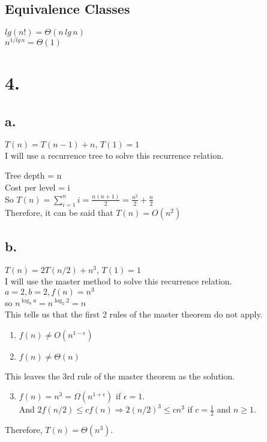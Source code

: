 \documentclass[12pt]{article}
\begin{document}
\subsection*{Equivalence Classes}
$lg(n!) = \Theta(n\,lg\,n)$\\
$n^{1/lg\,n} = \Theta(1)$

\section*{4.}
\subsection*{a.} $T(n) = T(n-1)+n,\,T(1) = 1$\\
I will use a recurrence tree to solve this recurrence relation.\\
\begin{center}
\end{center}
Tree depth = n\\
Cost per level = i\\
So $T(n) = \sum_{i = 1}^{n} i = \frac{n(n+1)}{2} = \frac{n^2}{2} + \frac{n}{2}$\\
Therefore, it can be said that $T(n) =  O(n^2)$\\
\subsection*{b.} $T(n) = 2T(n/2)+n^3,\,T(1) = 1$\\
I will use the master method to solve this recurrence relation.\\
$a=2, b=2, f(n)=n^3$\\
so $n^{\log_{b} a} = n^{\log_{2} 2} = n$\\
This tells us that the first 2 rules of the master theorem do not apply.
\begin{enumerate}
\item $f(n) \ne O(n^{1-\epsilon})$
\item $f(n) \ne \Theta{(n)}$
\end{enumerate}
This leaves the 3rd rule of the master theorem as the solution.\\
\begin{enumerate}
\setcounter{enumi}{2}
\item $f(n) = n^3 = \Omega{(n^{1+\epsilon})}$ if $\epsilon = 1$. \\ 
And $2f(n/2) \le cf(n) \Rightarrow 2(n/2)^3 \le cn^3$ if $c=\frac{1}{2}$ and $n \ge 1$.\\
\end{enumerate}
Therefore, $T(n) = \Theta{(n^3)}$.
\end{document}
